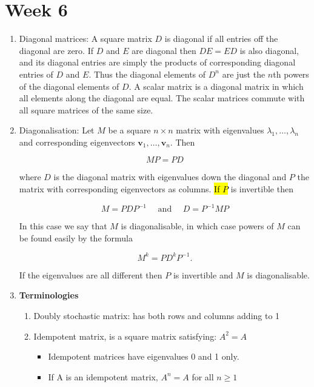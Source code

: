 \documentclass{article}
\begin{document}
\newpage

\section{Week 6}
    \begin{enumerate}
        \item Diagonal matrices: A square matrix $D$ is diagonal if all entries off the diagonal are zero. If $D$ and $E$ are diagonal then $D E=E D$ is also diagonal, and its diagonal entries are simply the products of corresponding diagonal entries of $D$ and $E$. Thus the diagonal elements of $D^{n}$ are just the $n$th powers of the diagonal elements of $D$. A scalar matrix is a diagonal matrix in which all elements along the diagonal are equal. The scalar matrices commute with all square matrices of the same size.

        \item Diagonalisation: Let $M$ be a square $n \times n$ matrix with eigenvalues $\lambda_{1}, \ldots, \lambda_{n}$ and corresponding eigenvectors $\mathbf{v}_{1}, \ldots, \mathbf{v}_{n}$. Then

            $$
            M P=P D
            $$

        where $D$ is the diagonal matrix with eigenvalues down the diagonal and $P$ the matrix with corresponding eigenvectors as columns. \hl{If $P$} is invertible then

            $$
            M=P D P^{-1} \quad \text { and } \quad D=P^{-1} M P
            $$

        In this case we say that $M$ is diagonalisable, in which case powers of $M$ can be found easily by the formula

            $$
            M^{k}=P D^{k} P^{-1} .
            $$

        If the eigenvalues are all different then $P$ is invertible and $M$ is diagonalisable.
        \item \textbf{Terminologies}
            \begin{enumerate}
                \item Doubly stochastic matrix: has both rows and columns adding to 1
                \item Idempotent matrix, is a square matrix satisfying: $A^2 = A$
                    \begin{itemize}
                        \item Idempotent matrices have eigenvalues 0 and 1 only.
                        \item If A is an idempotent matrix, $A^n = A$ for all $n \geq 1$
                    \end{itemize}


\end{enumerate}
\end{enumerate}
\end{document}
